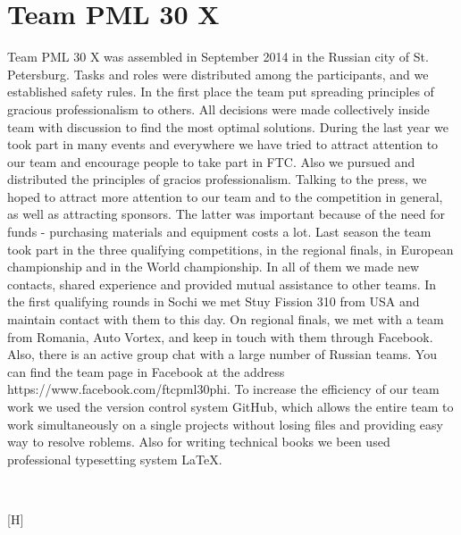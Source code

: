 
\section{Team PML 30 X} 
	Team PML 30 X was assembled in September 2014 in the Russian city of St. Petersburg. Tasks and roles were distributed among the participants, and we established safety rules. In the first place the team put spreading principles of gracious professionalism to others. All decisions were made collectively inside team with discussion to find the most optimal solutions. 
	During the last year we took part in many events and everywhere we have tried to attract attention to our team and encourage people to take part in FTC. Also we pursued and distributed the principles of gracios professionalism. Talking to the press, we hoped to attract more attention to our team and to the competition in general, as well as attracting sponsors. The latter was important because of the need for funds - purchasing materials and equipment costs a lot.
	Last season the team took part in the three qualifying competitions, in the regional finals, in European championship and in the World championship. In all of them we made new contacts, shared experience and provided mutual assistance to other teams. In the first qualifying rounds in Sochi we met Stuy Fission 310 from USA and maintain contact with them to this day. On regional finals, we met with a team from Romania, Auto Vortex, and keep in touch with them through Facebook. Also, there is an active group chat with a large number of Russian teams. You can find the team page in Facebook at the address https://www.facebook.com/ftcpml30phi.
	To increase the efficiency of our team work we used the version control system GitHub, which allows the entire team to work simultaneously on a single projects without losing files and providing easy way to resolve roblems. Also for writing technical books we been used professional typesetting system LaTeX.
	\begin{figure}[H]
		\\
	\end{figure}[H]
\fillpage

